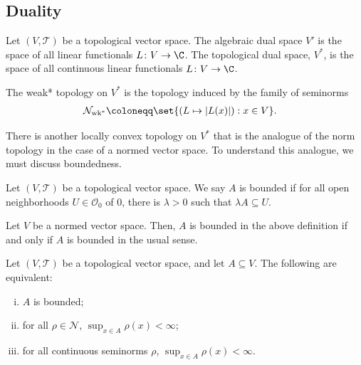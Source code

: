 \documentclass[10pt]{mypackage}
\renewcommand{\coloneq}{\coloneqq}
\begin{document}
\subsection{Duality}%
Let $\left( V,\mathcal{T} \right)$ be a topological vector space. The algebraic dual space $V'$ is the space of all linear functionals $L\colon V\rightarrow \C$. The topological dual space, $V^{\ast}$, is the space of all continuous linear functionals $L\colon V\rightarrow \C$.
\begin{definition}
  The weak* topology on $V^{\ast}$ is the topology induced by the family of seminorms
  \begin{align*}
    \mathcal{N}_{\operatorname{wk}^{\ast}} &\coloneq \set{ \left( L\mapsto \left\vert L(x) \right\vert \right) : x\in V }.
  \end{align*}
\end{definition}
There is another locally convex topology on $V^{\ast}$ that is the analogue of the norm topology in the case of a normed vector space. To understand this analogue, we must discuss boundedness.
\begin{definition}
  Let $\left( V,\mathcal{T} \right)$ be a topological vector space. We say $A$ is bounded if for all open neighborhoods $U\in \mathcal{O}_{0}$ of $0$, there is $\lambda > 0$ such that $\lambda A \subseteq U$.
\end{definition}
\begin{theorem}
  Let $V$ be a normed vector space. Then, $A$ is bounded in the above definition if and only if $A$ is bounded in the usual sense.
\end{theorem}
\begin{proposition}
  Let $\left( V,\mathcal{T} \right)$ be a topological vector space, and let $A\subseteq V$. The following are equivalent:
  \begin{enumerate}[(i)]
    \item $A$ is bounded;
    \item for all $\rho\in \mathcal{N}$, $\sup_{x\in A}\rho(x) < \infty$;
    \item for all continuous seminorms $\rho$, $\sup_{x\in A}\rho(x) < \infty$.
  \end{enumerate}
\end{proposition}
\end{document}
